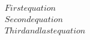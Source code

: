 \[
\begin{gathered}
First equation \\
Second equation \\[1ex]
Third and last equation
\end{gathered}
\]
